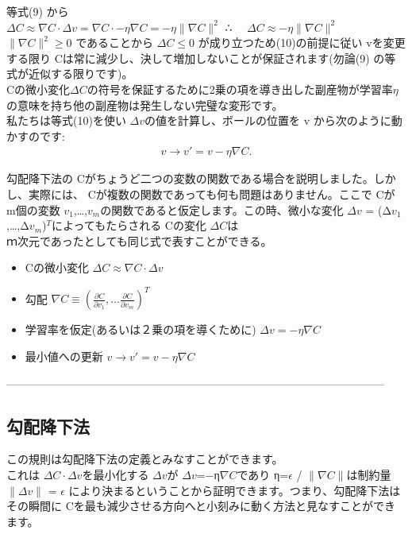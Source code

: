 \documentclass[11pt,a4paper,fleqn]{jsarticle}
\begin{document}
等式(9) から\\
\hspace{1.0cm} $ \Delta C \approx \nabla C \cdot \Delta v = \nabla C \cdot -\eta \nabla C =  -\eta \|\nabla C\|^2$
\hspace{1.0cm} ∴　 $\Delta C \approx -\eta \|\nabla C\|^2$ \\
$\|
\nabla C \|^2 \geq 0$ であることから $\Delta C \leq 0$ が成り立つため(10)の前提に従い vを変更する限り Cは常に減少し、決して増加しないことが保証されます(勿論(9) の等式が近似する限りです)。\\
  Cの微小変化$\Delta C$の符号を保証するために2乗の項を導き出した副産物が学習率$\eta$の意味を持ち他の副産物は発生しない完璧な変形です。\\
私たちは等式(10)を使い $\Delta v$の値を計算し、ボールの位置を v から次のように動かすのです:\\
\begin{eqnarray}
  v \rightarrow v' = v -\eta \nabla C.
\end{eqnarray}


勾配降下法の Cがちょうど二つの変数の関数である場合を説明しました。しかし、実際には、 Cが複数の関数であっても何も問題はありません。ここで Cが m個の変数 $v_1$,…,$v_m$の関数であると仮定します。この時、微小な変化 $\Delta v$ = (Δ$v_1$,…,Δ$v_m$)$^T$によってもたらされる Cの変化 $\Delta C$は\\
ｍ次元であったとしても同じ式で表すことができる。\\
\begin{itemize}
 \item  Cの微小変化\hspace{0.5cm} $ \Delta C \approx \nabla C \cdot \Delta v$
 \item  勾配 \hspace{0.5cm}  $\nabla C \equiv \left(\frac{\partial C}{\partial v_1}, \ldots \frac{\partial C}{\partial v_m}\right)^T$
 \item  学習率を仮定(あるいは２乗の項を導くために) \hspace{0.5cm} $\Delta v = -\eta \nabla C$
 \item  最小値への更新\hspace{0.5cm} $v \rightarrow v' = v-\eta \nabla C$
\end{itemize}
------------------------------------------------------------------------------------------------------\\
\subsection{勾配降下法}
この規則は勾配降下法の定義とみなすことができます。\\
これは $\Delta C \cdot \Delta v$を最小化する $\Delta v$が $\Delta v$=−η$\nabla C$であり η=$\epsilon$ / $\|\nabla C\|$は制約量 $\|\Delta v\|$ = $\epsilon$ により決まるということから証明できます。つまり、勾配降下法はその瞬間に Cを最も減少させる方向へと小刻みに動く方法と見なすことができます。\\
\end{document}
